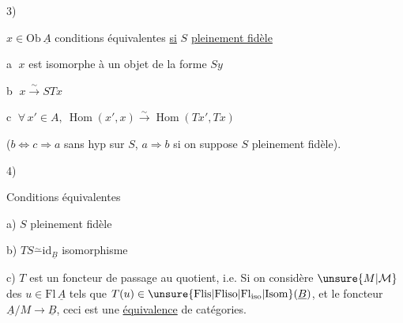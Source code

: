 3)

$x\in\mathrm{Ob}\,\underline A$ conditions équivalentes \uline{si} $S$ \uline{pleinement fidèle}

\textcircled{a} $x$ est isomorphe à un objet de la forme $Sy$

\textcircled{b} $x\xrightarrow{\sim}STx$

\textcircled{c} $\forall\,x'\in A,\ \operatorname{Hom}(x',x)\xrightarrow{\sim}\operatorname{Hom}(Tx',Tx)$

($b\Leftrightarrow c\Rightarrow a$ sans hyp sur $S$, $a\Rightarrow b$ si on suppose $S$ pleinement fidèle).

4)

Conditions équivalentes

a) $S$ pleinement fidèle

b) $TS\overset{\sim}{-}\mathrm{id}_{\underline B}$ isomorphisme

c) $T$ est un foncteur de passage au quotient, i.e. Si on considère  $\unsure{M|\mathcal M}$ des $u\in\mathrm{Fl}\,\underline A$ tels que $T(u)\in\unsure{\mathrm{Flis}|\mathrm{Fliso}|\mathrm{Fl}_{\rm iso}|\mathrm{Isom}}(\underline B)$, et le foncteur $\underline A/M\to\underline B$, ceci est une \uline{équivalence} de catégories.

